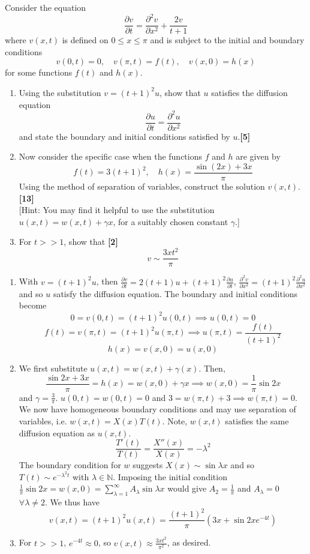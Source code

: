 \documentclass[a4paper]{article}
\begin{document}
\begin{qns}
Consider the equation
$$\frac{\partial v}{\partial t}=\frac{\partial^2v}{\partial x^2}+\frac{2v}{t+1}$$
where $v(x, t)$ is defined on $0\leq x\leq \pi$ and is subject to the initial and boundary conditions
$$v(0,t)=0,\quad v(\pi,t)=f(t),\quad v(x,0)=h(x)$$
for some functions $f(t)$ and $h(x)$.
\begin{enumerate}[label=(\alph*)]
\item Using the substitution $v=(t+1)^2u$, show that $u$ satisfies the diffusion equation
$$\frac{\partial u}{\partial t}=\frac{\partial^2u}{\partial x^2}$$
and state the boundary and initial conditions satisfied by $u$.\hfill\textbf{[5]}
\item Now consider the specific case when the functions $f$ and $h$ are given by
$$f(t)=3(t+1)^2,\quad h(x)=\frac{\sin(2x)+3x}{\pi}$$
Using the method of separation of variables, construct the solution $v(x, t)$.\hfill\textbf{[13]}\\[5pt]
[Hint: You may find it helpful to use the substitution $u(x, t) = w(x, t) + \gamma x$, for a suitably chosen constant $\gamma$.]
\item For $t>>1$, show that \hfill\textbf{[2]}
$$v\sim\frac{3xt^2}{\pi}$$
\end{enumerate}
\end{qns}
\begin{ans}\leavevmode
\begin{enumerate}[label=(\alph*)]
    \item With $v=(t+1)^2u$, then $\frac{\partial v}{\partial t}=2(t+1)u+(t+1)^2\frac{\partial u}{\partial t}$, $\frac{\partial^2v}{\partial x^2}=(t+1)^2\frac{\partial^2u}{\partial x^2}$ and so $u$ satisfy the diffusion equation. The boundary and initial conditions become $$0=v(0,t)=(t+1)^2u(0,t)\implies u(0,t)=0$$ $$f(t)=v(\pi,t)=(t+1)^2u(\pi,t)\implies u(\pi,t)=\frac{f(t)}{(t+1)^2}$$
$$h(x)=v(x,0)=u(x,0)$$
\item We first substitute $u(x,t)=w(x,t)+\gamma (x)$. Then, $$\frac{\sin 2x+3x}{\pi}=h(x)=w(x,0)+\gamma x\implies w(x,0)=\frac{1}{\pi}\sin 2x$$ and $\gamma=\frac{3}{\pi}$. $u(0,t)=w(0,t)=0$ and $3=w(\pi,t)+3\implies w(\pi,t)=0$. We now have homogeneous boundary conditions and may use separation of variables, i.e. $w(x,t)=X(x)T(t)$. Note, $w(x,t)$ satisfies the same diffusion equation as $u(x,t)$.
$$\frac{T'(t)}{T(t)}=\frac{X''(x)}{X(x)}=-\lambda^2$$
The boundary condition for $w$ suggests $X(x)\sim\sin\lambda x$ and so $T(t)\sim e^{-\lambda^2t}$ with $\lambda\in\mathbb{N}$. Imposing the initial condition $\frac{1}{\pi}\sin 2x=w(x,0)=\sum_{\lambda=1}^\infty A_\lambda\sin\lambda x$ would give $A_2=\frac{1}{\pi}$ and $A_\lambda=0$ $\forall\lambda\neq 2$. We thus have
$$v(x,t)=(t+1)^2u(x,t)=\frac{(t+1)^2}{\pi}(3x+\sin 2x e^{-4t})$$
\item For $t>>1$, $e^{-4t}\approx 0$, so $v(x,t)\approx\frac{3xt^2}{\pi^2}$, as desired.
\end{enumerate}
\end{ans}
\end{document}
